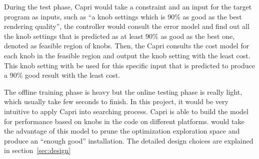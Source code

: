   During the test phase, Capri would take a
  constraint and an input for the target program as inputs, such as ``a knob
  settings which is 90\% as good as the best rendering quality'', the
  controller would consult the error model and find out
  all the knob settings that is predicted as at least 90\% as good as the best
  one, denoted as feasible region of knobs. Then, the Capri consults the
  cost model for each knob in the feasible region and output the knob setting
  with the least cost. This knob setting with be used for this specific input
  that is predicted to produce a 90\% good result with the least cost.

  The offline training phase is heavy but the online testing phase is really
  light, which usually take few seconds to finish.
  In this project, it would be very intuitive to apply Capri into \atl
  searching process. Capri is able to build the model for \gem performance
  based on knobs in the code on
  different platforms. \atl would take the advantage of this model to prune
  the optimization exploration space and produce an ``enough good'' \gem
  installation. The detailed design choices are explained in
  section~\ref{sec:design}


